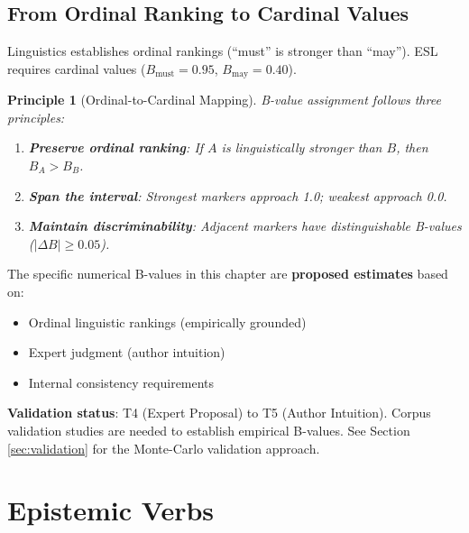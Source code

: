 \documentclass[11pt,a4paper]{article}
\newtheorem{principle}{Principle}[section]
\theoremstyle{remark}
\begin{document}
\subsection{From Ordinal Ranking to Cardinal Values}

Linguistics establishes ordinal rankings (``must'' is stronger than ``may''). ESL requires cardinal values ($B_{\text{must}} = 0.95$, $B_{\text{may}} = 0.40$).

\begin{principle}[Ordinal-to-Cardinal Mapping]
\label{princ:mapping}
B-value assignment follows three principles:
\begin{enumerate}
    \item \textbf{Preserve ordinal ranking}: If $A$ is linguistically stronger than $B$, then $B_A > B_B$.
    \item \textbf{Span the interval}: Strongest markers approach 1.0; weakest approach 0.0.
    \item \textbf{Maintain discriminability}: Adjacent markers have distinguishable B-values ($|\Delta B| \geq 0.05$).
\end{enumerate}
\end{principle}

\begin{warningbox}
The specific numerical B-values in this chapter are \textbf{proposed estimates} based on:
\begin{itemize}
    \item Ordinal linguistic rankings (empirically grounded)
    \item Expert judgment (author intuition)
    \item Internal consistency requirements
\end{itemize}

\textbf{Validation status}: T4 (Expert Proposal) to T5 (Author Intuition). Corpus validation studies are needed to establish empirical B-values. See Section \ref{sec:validation} for the Monte-Carlo validation approach.
\end{warningbox}


\section{Epistemic Verbs}
\label{sec:epistemic-verbs}
\end{document}
